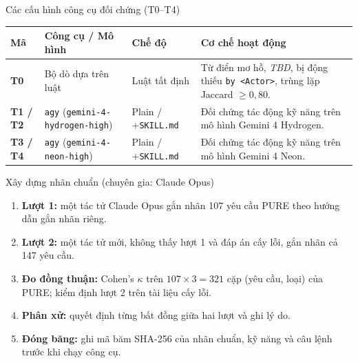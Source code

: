 \documentclass[aspectratio=169,10pt]{beamer}
\begin{document}
\begin{frame}{Các cấu hình công cụ đối chứng (T0--T4)}
  \footnotesize
  \begin{tabular}{lllp{4.9cm}}
    \toprule
    \textbf{Mã} & \textbf{Công cụ / Mô hình} & \textbf{Chế độ} & \textbf{Cơ chế hoạt động} \\
    \midrule
    \textbf{T0} & Bộ dò dựa trên luật & Luật tất định & Từ điển mơ hồ, \textit{TBD}, bị động thiếu \texttt{by <Actor>}, trùng lặp Jaccard $\ge 0{,}80$. \\
    \textbf{T1 / T2} & \texttt{agy} (\texttt{gemini-4-hydrogen-high}) & Plain / +\texttt{SKILL.md} & Đối chứng tác động kỹ năng trên mô hình Gemini 4 Hydrogen. \\
    \textbf{T3 / T4} & \texttt{agy} (\texttt{gemini-4-neon-high}) & Plain / +\texttt{SKILL.md} & Đối chứng tác động kỹ năng trên mô hình Gemini 4 Neon. \\
    \bottomrule
  \end{tabular}
\end{frame}

\begin{frame}{Xây dựng nhãn chuẩn (chuyên gia: Claude Opus)}
  \begin{enumerate}
    \item \textbf{Lượt 1:} một tác tử Claude Opus gắn nhãn 107 yêu cầu PURE theo hướng dẫn gắn nhãn riêng.
    \item \textbf{Lượt 2:} một tác tử mới, không thấy lượt 1 và đáp án cấy lỗi, gắn nhãn cả 147 yêu cầu.
    \item \textbf{Đo đồng thuận:} Cohen's $\kappa$ trên $107 \times 3 = 321$ cặp (yêu cầu, loại) của PURE; kiểm định lượt 2 trên tài liệu cấy lỗi.
    \item \textbf{Phân xử:} quyết định từng bất đồng giữa hai lượt và ghi lý do.
    \item \textbf{Đóng băng:} ghi mã băm SHA-256 của nhãn chuẩn, kỹ năng và câu lệnh trước khi chạy công cụ.
  \end{enumerate}
\end{frame}
\end{document}
